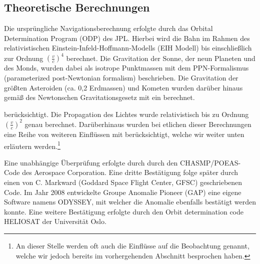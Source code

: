 
\subsection{Theoretische Berechnungen}
Die ursprüngliche Navigationsberechnung erfolgte durch das Orbital Determination Program (ODP) des JPL.
Hierbei wird die Bahn im Rahmen des relativistischen Einstein-Infeld-Hoffmann-Modells (EIH Modell)
bis einschließlich zur Ordnung $(\frac{v}{c})^4$ berechnet.
Die Gravitation der Sonne, der neun Planeten und des Monds, wurden dabei als isotrope Punktmassen mit dem
PPN-Formalismus (parameterized post-Newtonian formalism) beschrieben\cite{Anderson2002}. Die Gravitation der größten
Asteroiden (ca. 0,2 Erdmassen) und Kometen wurden darüber hinaus gemäß des Newtonschen Gravitationsgesetz mit
ein berechnet.

berücksichtigt.
Die Propagation des Lichtes wurde relativistisch bis zu Ordnung $(\frac{v}{c})^2$ genau berechnet.
Darüberhinaus wurden bei etlichen dieser Berechnungen eine Reihe von weiteren Einflüssen mit berücksichtigt, welche wir
weiter unten %
erläutern werden.\footnote{An dieser Stelle werden oft auch die Einflüsse auf die Beobachtung genannt, welche wir jedoch
bereits im vorhergehenden Abschnitt besprochen haben.}


Eine unabhängige Überprüfung erfolgte durch durch den CHASMP/POEAS-Code des Aerospace Corporation.
Eine dritte Bestätigung folge später durch einen von C. Markward (Goddard Space Flight Center, GFSC) geschriebenen Code.
Im Jahr 2008 entwickelte Groupe Anomalie Pioneer (GAP) eine eigene Software namens ODYSSEY,
mit welcher die Anomalie ebenfalls bestätigt werden konnte.
Eine weitere Bestätigung erfolgte durch den Orbit determination code HELIOSAT der Universität Oslo.